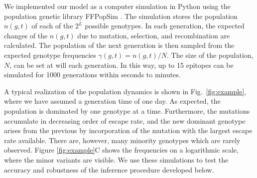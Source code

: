 \documentclass{frontiers}
\newcommand{\FIG}[1]{Fig.~\ref{fig:#1}}
\newcommand{\gt}{g}
\newcommand{\gtfreq}{\gamma}
\begin{document}
We implemented our model as a computer simulation in Python using the population genetic
library FFPopSim \citep{zanini_ffpopsim:_2012}. 
The simulation stores the population $n(\gt,t)$ of each of the $2^L$
possible genotypes. In each generation, the expected changes of the $n(\gt,t)$
due to mutation, selection, and recombination are calculated. The population of
the next generation is then sampled from the expected genotype frequencies
$\gtfreq(\gt,t) = n(\gt,t)/N$.
The size of the population, $N$, can be set at will each generation. In this way, up to
15 epitopes can be simulated for 1000 generations within seconds to minutes. 

A typical realization of the population dynamics is shown in
\FIG{example}, where we have assumed a generation time of one day. 
As expected, the population is dominated by one genotype at a time.
Furthermore, the mutations accumulate in decreasing order of escape rate, and the new
dominant genotype arises from the previous by incorporation of the mutation with
the largest escape rate available. There are, however, many minority genotypes which
are rarely observed. Figure \ref{fig:example}C shows the frequencies on a
logarithmic scale, where the minor variants are visible. We use these
simulations to test the accuracy and robustness 
of the inference procedure developed below.
\end{document}
